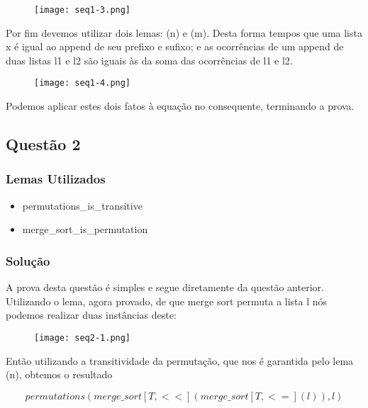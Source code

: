 \documentclass[12pt]{article}
\begin{document}
\begin{figure}[H]
    \centering
    \texttt{[image: seq1-3.png]}
    \caption{}
    \label{}
\end{figure}

Por fim devemos utilizar dois lemas: (n) e (m).
Desta forma tempos que uma lista x é igual ao append de seu prefixo e sufixo; e as ocorrências de um append de duas listas l1 e l2 são iguais às da soma das ocorrências de l1 e l2.

\begin{figure}[H]
    \centering
    \texttt{[image: seq1-4.png]}
    \caption{}
    \label{}
\end{figure}

Podemos aplicar estes dois fatos à equação no consequente, terminando a prova.


\subsection{Questão 2}

\subsubsection{Lemas Utilizados}

\begin{itemize}
    \item permutations\_is\_transitive
    \item merge\_sort\_is\_permutation
\end{itemize}

\subsubsection{Solução}


A prova desta questão é simples e segue diretamente da questão anterior. Utilizando o lema, agora provado, de que merge sort permuta a lista l nós podemos realizar duas instâncias deste:

\begin{figure}[H]
    \centering
    \texttt{[image: seq2-1.png]}
    \caption{}
    \label{}
\end{figure}

Então utilizando a transitividade da permutação, que nos é garantida pelo lema (n), obtemos o resultado

\begin{equation}
    permutations(merge\_sort[T, <<](merge\_sort[T, <=](l)), l)
\end{equation}
\end{document}
